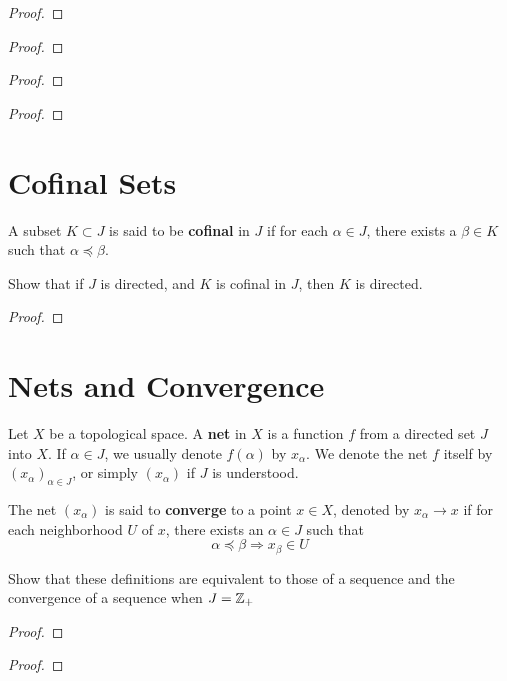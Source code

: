 \documentclass[12pt]{article}
\begin{document}
\begin{proof}
\end{proof}
\begin{proof}
\end{proof}
\begin{proof}
\end{proof}
\begin{proof}
\end{proof}

\section{Cofinal Sets}
\begin{defn}
	A subset $K \subset J$ is said to be \textbf{cofinal} in $J$ if for each $\alpha \in J$, there exists a $\beta \in K$ such that $\alpha \preceq \beta$.
\end{defn}

Show that if $J$ is directed, and $K$ is cofinal in $J$, then $K$ is directed.

\begin{proof}
\end{proof}

\section{Nets and Convergence}
\begin{defn}
	Let $X$ be a topological space. A \textbf{net} in $X$ is a function $f$ from a directed set $J$ into $X$. If $\alpha \in J$, we usually denote $f(\alpha)$ by $x_\alpha$. We denote the net $f$ itself by ${\left(x_\alpha\right)}_{\alpha \in J}$, or simply $(x_\alpha)$ if $J$ is understood.
\end{defn}
\begin{defn}
	The net $(x_\alpha)$ is said to \textbf{converge} to a point $x \in X$, denoted by $x_\alpha \to x$ if for each neighborhood $U$ of $x$, there exists an $\alpha \in J$ such that
	\[\alpha \preceq \beta \Longrightarrow x_\beta \in U\]
\end{defn}

Show that these definitions are equivalent to those of a sequence and the convergence of a sequence when $J = \mathbb{Z}_+$

\begin{proof}
\end{proof}
\begin{proof}
\end{proof}
\end{document}

